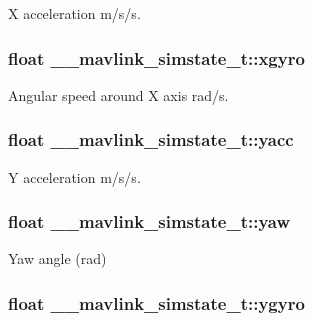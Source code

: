 X acceleration m/s/s. 

\hypertarget{struct____mavlink__simstate__t_a46ce2cfef0c0307dcb3429242f22f036}{
\subsubsection[{xgyro}]{\setlength{\rightskip}{0pt plus 5cm}float \+\_\+\+\_\+mavlink\+\_\+simstate\+\_\+t\+::xgyro}}\label{struct____mavlink__simstate__t_a46ce2cfef0c0307dcb3429242f22f036}


Angular speed around X axis rad/s. 

\hypertarget{struct____mavlink__simstate__t_a5800791e1ad33ebfa1f996404ba5dd46}{
\subsubsection[{yacc}]{\setlength{\rightskip}{0pt plus 5cm}float \+\_\+\+\_\+mavlink\+\_\+simstate\+\_\+t\+::yacc}}\label{struct____mavlink__simstate__t_a5800791e1ad33ebfa1f996404ba5dd46}


Y acceleration m/s/s. 

\hypertarget{struct____mavlink__simstate__t_a2fcba43b2b572128fb1f8abe9e16e5a5}{
\subsubsection[{yaw}]{\setlength{\rightskip}{0pt plus 5cm}float \+\_\+\+\_\+mavlink\+\_\+simstate\+\_\+t\+::yaw}}\label{struct____mavlink__simstate__t_a2fcba43b2b572128fb1f8abe9e16e5a5}


Yaw angle (rad) 

\hypertarget{struct____mavlink__simstate__t_ad5c386d5196b06c75c5e533a5edaa9ce}{
\subsubsection[{ygyro}]{\setlength{\rightskip}{0pt plus 5cm}float \+\_\+\+\_\+mavlink\+\_\+simstate\+\_\+t\+::ygyro}}\label{struct____mavlink__simstate__t_ad5c386d5196b06c75c5e533a5edaa9ce}


